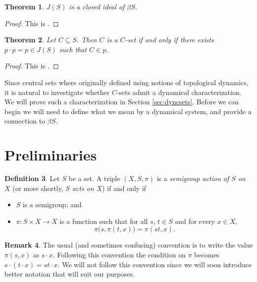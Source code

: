 \documentclass[12pt]{article}
\theoremstyle{plain}
\newtheorem{thm}{Theorem}[section]
\theoremstyle{definition}
\newtheorem{defn}[thm]{Definition}
\newtheorem{rmk}[thm]{Remark}
\begin{document}
  \begin{thm}
    $J(S)$ is a closed ideal of $\beta S$.
  \end{thm}
  \begin{proof}
   This is \cite[Theorem 3.5]{De:2008uq}.
  \end{proof}
  
  \begin{thm}
    \label{thm:csetid}
    Let $C \subseteq S$. 
    Then $C$ is a $C$-set if and only if there exists $p\cdot p = p
    \in J(S)$ such that $C \in p$.
  \end{thm}
  \begin{proof}
    This is \cite[Theorem 3.8]{De:2008uq}.%
  \end{proof}

Since central sets where originally defined using notions of
topological dynamics, it is natural to investigate whether $C$-sets
admit a dynamical characterization.
We will prove such a characterization in Section \ref{sec:dyncsets}.
Before we can begin we will need to define what we mean by a dynamical
system, and provide a connection to $\beta S$.

\section{Preliminaries}
  \begin{defn}
    \label{defn:semiact}
    Let $S$ be a set. 
    A triple $(X, S, \pi)$ is a \textsl{semigroup action of $S$ on
      $X$} (or more shortly, \textsl{$S$ acts on $X$}) if and only if 
      \begin{itemize}
        \item[(1)] $S$ is a semigroup; and
        
        \item[(2)] $\pi : S \times X \to X$ is a function such that
          for all $s$, $t \in S$ and for every $x \in X$,
          \[ \pi\bigl(s, \pi(t,x)\bigr) = \pi(st, x). \]
      \end{itemize}
  \end{defn}
  
  \begin{rmk}
    The usual (and sometimes confusing) convention is to write the value
    $\pi(s,x)$ as $s \cdot x$.
    Following this convention the condition on $\pi$ becomes $s \cdot (t
    \cdot x) = st \cdot x$.
    We will not follow this convention since we will soon introduce
    better notation that will suit our purposes.
  \end{rmk}
\end{document}
